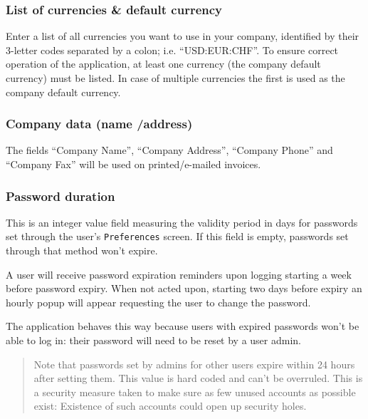 \subsubsection{List of currencies \& default currency}
\label{subsubsec-company-config-defaults-currencies}

Enter a list of all currencies you want
to use in your company, identified by their 3-letter codes separated by a colon; i.e.
``USD:EUR:CHF''. To ensure correct operation of the application, at least one currency
(the company default currency) must be listed. In case of multiple currencies the first
is used as the company default currency.

\subsubsection{Company data (name /address)}
\label{subsubsec-company-config-defaults-name-address}

The fields ``Company Name'', ``Company Address'',
``Company Phone'' and ``Company Fax'' will be used on printed/e-mailed invoices.

\subsubsection{Password duration}
\label{subsubsec-company-config-defaults-password-duration}

This is an integer value field measuring the validity period in days for passwords set through
the user's \texttt{Preferences} screen. If this field is empty, passwords set through that method
won't expire.

A user will receive password expiration reminders upon logging starting a week before password
expiry. When not acted upon, starting two days before expiry an hourly popup will appear
requesting the user to change the password.

The application behaves this way because users with expired passwords won't be able to log in:
their password will need to be reset by a user admin.

\begin{quote}
Note that passwords set by admins for other users expire within 24 hours after setting them.
This value is hard coded and can't be overruled. This is a security measure taken to make
sure as few unused accounts as possible exist: Existence of such accounts could open up security
holes.
\end{quote}


